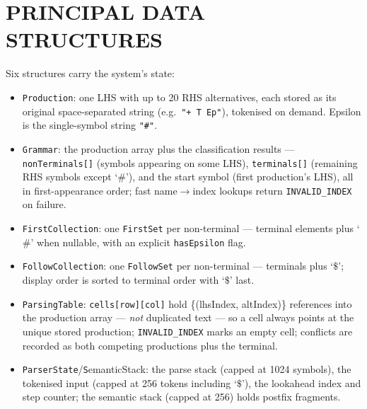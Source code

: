 \documentclass[12pt,a4paper,oneside,openany]{report}
\newcommand{\code}[1]{\texttt{#1}}
\begin{document}
\section{PRINCIPAL DATA STRUCTURES}
Six structures carry the system's state:
\begin{itemize}
  \item \code{Production}: one LHS with up to 20 RHS alternatives, each
        stored as its original space-separated string (e.g.\ \code{"+ T
        Ep"}), tokenised on demand. Epsilon is the single-symbol string
        \code{"\#"}.
  \item \code{Grammar}: the production array plus the classification
        results --- \code{nonTerminals[]} (symbols appearing on some LHS),
        \code{terminals[]} (remaining RHS symbols except `$\#$'), and the
        start symbol (first production's LHS), all in first-appearance
        order; fast name$\to$index lookups return \code{INVALID\_INDEX} on
        failure.
  \item \code{FirstCollection}: one \code{FirstSet} per non-terminal ---
        terminal elements plus `$\#$' when nullable, with an explicit
        \code{hasEpsilon} flag.
  \item \code{FollowCollection}: one \code{FollowSet} per non-terminal ---
        terminals plus `$\$$'; display order is sorted to terminal order
        with `$\$$' last.
  \item \code{ParsingTable}: \code{cells[row][col]} hold
        \{(lhsIndex, altIndex)\} references into the production array ---
        \emph{not} duplicated text --- so a cell always points at the
        unique stored production; \code{INVALID\_INDEX} marks an empty
        cell; conflicts are recorded as both competing productions plus
        the terminal.
  \item \code{ParserState}/{\code SemanticStack}: the parse stack
        (capped at 1024 symbols), the tokenised input (capped at 256
        tokens including `$\$$'), the lookahead index and step counter;
        the semantic stack (capped at 256) holds postfix fragments.
\end{itemize}
\end{document}
